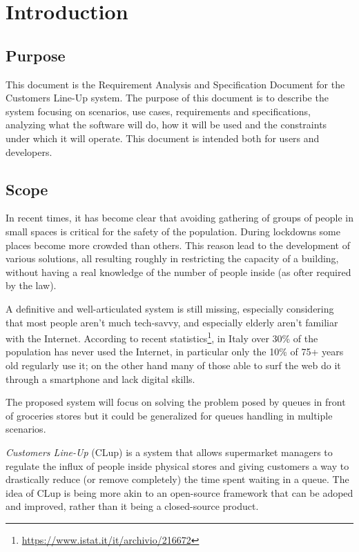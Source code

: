 
\section{Introduction}\label{sec:intro}


\subsection{Purpose}
This document is the Requirement Analysis and Specification Document for the Customers Line-Up system.
The purpose of this document is to describe the system focusing on scenarios, use cases, requirements and 
specifications, analyzing what the software will do, how it will be used and the constraints under which it
will operate. This document is intended both for users and developers.

\subsection{Scope}
In recent times, it has become clear that avoiding gathering of groups of people in small spaces is critical
for the safety of the population. During lockdowns some places become more crowded than others. 
This reason lead to the development of various solutions, all resulting roughly in restricting the capacity
of a building, without having a real knowledge of the number of people inside (as ofter required by the law).

A definitive and well-articulated system is still missing, especially considering that most people aren't much
tech-savvy, and especially elderly aren't familiar with the Internet.
According to recent statistics\footnote[1]{\url{https://www.istat.it/it/archivio/216672}}, in Italy over 30\% of the population has
never used the Internet, in particular only the 10\% of 75+ years old regularly use it; on the other hand many of
those able to surf the web do it through a smartphone and lack digital skills.

The proposed system will focus on solving the problem posed by queues in front of groceries stores but it could
be generalized for queues handling in multiple scenarios.

\emph{Customers Line-Up} (CLup) is a system that allows supermarket managers to regulate the influx of people
inside physical stores and giving customers a way to drastically reduce (or remove completely) the time spent
waiting in a queue. The idea of CLup is being more akin to an open-source framework that can be adoped and improved, rather
than it being a closed-source product.

